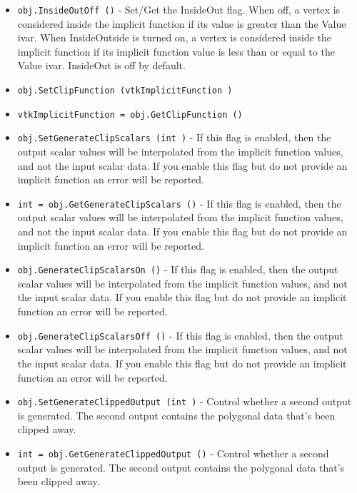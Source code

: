 \begin{itemize}
\item  \verb|obj.InsideOutOff ()| -  Set/Get the InsideOut flag. When off, a vertex is considered
 inside the implicit function if its value is greater than the
 Value ivar. When InsideOutside is turned on, a vertex is
 considered inside the implicit function if its implicit function
 value is less than or equal to the Value ivar.  InsideOut is off
 by default.

\item  \verb|obj.SetClipFunction (vtkImplicitFunction )|

\item  \verb|vtkImplicitFunction = obj.GetClipFunction ()|

\item  \verb|obj.SetGenerateClipScalars (int )| -  If this flag is enabled, then the output scalar values will be 
 interpolated from the implicit function values, and not the 
 input scalar data. If you enable this flag but do not provide an
 implicit function an error will be reported.

\item  \verb|int = obj.GetGenerateClipScalars ()| -  If this flag is enabled, then the output scalar values will be 
 interpolated from the implicit function values, and not the 
 input scalar data. If you enable this flag but do not provide an
 implicit function an error will be reported.

\item  \verb|obj.GenerateClipScalarsOn ()| -  If this flag is enabled, then the output scalar values will be 
 interpolated from the implicit function values, and not the 
 input scalar data. If you enable this flag but do not provide an
 implicit function an error will be reported.

\item  \verb|obj.GenerateClipScalarsOff ()| -  If this flag is enabled, then the output scalar values will be 
 interpolated from the implicit function values, and not the 
 input scalar data. If you enable this flag but do not provide an
 implicit function an error will be reported.

\item  \verb|obj.SetGenerateClippedOutput (int )| -  Control whether a second output is generated. The second output
 contains the polygonal data that's been clipped away.

\item  \verb|int = obj.GetGenerateClippedOutput ()| -  Control whether a second output is generated. The second output
 contains the polygonal data that's been clipped away.


\end{itemize}
